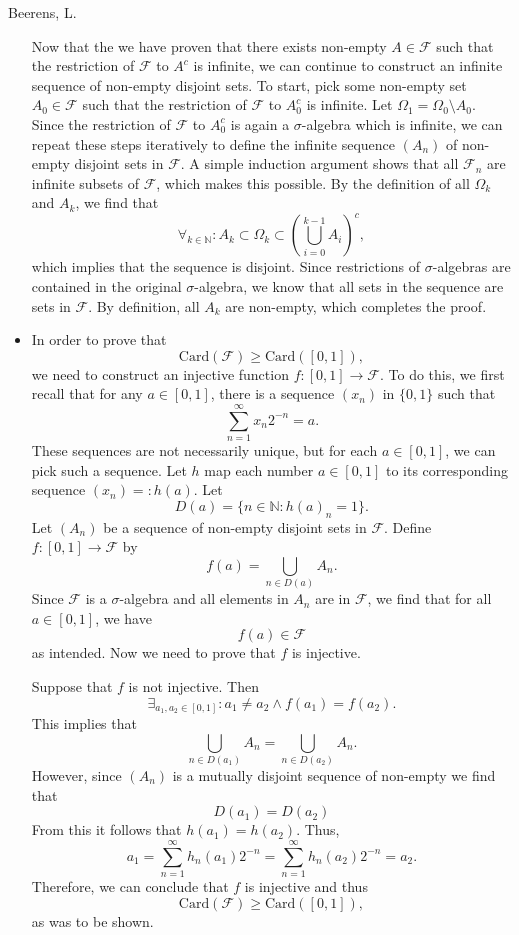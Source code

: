 \begin{solution}[2.17]{Beerens, L.}
\begin{itemize}
        Now that the we have proven that there exists non-empty $A\in\mathcal{F}$ such that the restriction of $\mathcal{F}$ to $A^c$ is infinite, we can continue to construct an infinite sequence of non-empty disjoint sets. To start, pick some non-empty set $A_0\in\mathcal{F}$ such that the restriction of $\mathcal{F}$ to $A_0^c$ is infinite. Let $\Omega_1 = \Omega_0\setminus A_0$. Since the restriction of $\mathcal{F}$ to $A_0^c$ is again a $\sigma$-algebra which is infinite, we can repeat these steps iteratively to define the infinite sequence $(A_n)$ of non-empty disjoint sets in $\mathcal{F}$. A simple induction argument shows that all $\mathcal{F}_n$ are infinite subsets of $\mathcal{F}$, which makes this possible. By the definition of all $\Omega_k$ and $A_k$, we find that
        $$
            \forall_{k\in\mathbb{N}}: A_k\subset\Omega_k \subset\left(\bigcup_{i=0}^{k-1}A_i\right)^c,
        $$
        which implies that the sequence is disjoint. Since restrictions of $\sigma$-algebras are contained in the original $\sigma$-algebra, we know that all sets in the sequence are sets in $\mathcal{F}$. By definition, all $A_k$ are non-empty, which completes the proof.
        
        \item In order to prove that
        $$
            \text{Card}(\mathcal{F})\geq\text{Card}([0,1]),
        $$
        we need to construct an injective function $f : [0,1] \rightarrow \mathcal{F}$. To do this, we first recall that for any $a\in[0,1]$, there is a sequence $(x_n)$ in $\{0,1\}$ such that 
        $$
            \sum_{n=1}^\infty x_n2^{-n} = a.
        $$
        These sequences are not necessarily unique, but for each $a\in[0,1]$, we can pick such a sequence. Let $h$ map each number $a\in[0,1]$ to its corresponding sequence $(x_n)=:h(a)$.
        Let 
        $$
            D(a)=\{n\in\mathbb{N}:h(a)_n=1\}.
        $$
        Let $(A_n)$ be a sequence of non-empty disjoint sets in $\mathcal{F}$.
        Define $f:[0,1]\rightarrow\mathcal{F}$ by
        $$
            f(a) = \bigcup_{n\in D(a)} A_n.
        $$
        Since $\mathcal{F}$ is a $\sigma$-algebra and all elements in $A_n$ are in $\mathcal{F}$, we find that for all $a\in[0,1]$, we have
        $$
            f(a)\in\mathcal{F}
        $$
        as intended. Now we need to prove that $f$ is injective.
        
        Suppose that $f$ is not injective. Then 
        $$
            \exists_{a_1,a_2\in[0,1]}: a_1\neq a_2 \land f(a_1) = f(a_2).
        $$
        This implies that 
        $$
            \bigcup_{n\in D(a_1)} A_n = \bigcup_{n\in D(a_2)} A_n .
        $$
        However, since $(A_n)$ is a mutually disjoint sequence of non-empty we find that
        $$
            D(a_1) = D(a_2)
        $$
        From this it follows that $h(a_1) = h(a_2)$. Thus,
        $$
            a_1 = \sum_{n=1}^\infty h_n(a_1)2^{-n} = \sum_{n=1}^\infty h_n(a_2)2^{-n} = a_2.
        $$
        Therefore, we can conclude that $f$ is injective and thus
        $$
            \text{Card}(\mathcal{F})\geq\text{Card}([0,1]),
        $$
        as was to be shown.
    \end{itemize}
\end{solution}